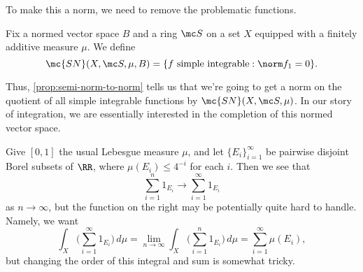 \documentclass[../notes.tex]{subfiles}
\begin{document}
To make this a norm, we need to remove the problematic functions.
\begin{notation}
	Fix a normed vector space $B$ and a ring $\mc S$ on a set $X$ equipped with a finitely additive measure $\mu$. We define
	\[\mc{SN}(X,\mc S,\mu,B)=\{f\text{ simple integrable}:\norm f_1=0\}.\]
\end{notation}
Thus, \autoref{prop:semi-norm-to-norm} tells us that we're going to get a norm on the quotient of all simple integrable functions by $\mc {SN}(X,\mc S,\mu)$. In our story of integration, we are essentially interested in the completion of this normed vector space.
\begin{example}
	Give $[0,1]$ the usual Lebesgue measure $\mu$, and let $\{E_i\}_{i=1}^\infty$ be pairwise disjoint Borel subsets of $\RR$, where $\mu(E_i)\le 4^{-i}$ for each $i$. Then we see that
	\[\sum_{i=1}^n1_{E_i}\to\sum_{i=1}^\infty1_{E_i}\]
	as $n\to\infty$, but the function on the right may be potentially quite hard to handle. Namely, we want
	\[\int_X\Bigg(\sum_{i=1}^\infty1_{E_i}\Bigg)\,d\mu=\lim_{n\to\infty}\int_X\Bigg(\sum_{i=1}^n1_{E_i}\Bigg)\,d\mu=\sum_{i=1}^\infty\mu(E_i),\]
	but changing the order of this integral and sum is somewhat tricky.
\end{example}
\end{document}
